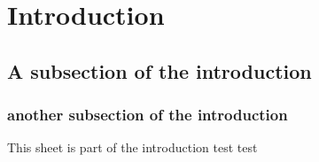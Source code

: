 \chapter{Introduction}

\section{A subsection of the introduction}

\subsection{another subsection of the introduction}

This sheet is part of the introduction test test